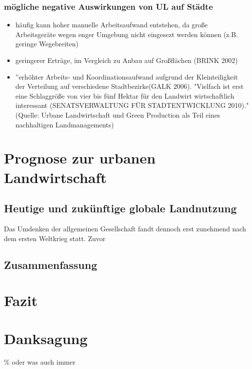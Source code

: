 \documentclass{scrartcl}
\begin{document}
     
 \subsubsection{mögliche negative Auswirkungen von UL auf Städte}
 \begin{itemize}
     \item häufig kann hoher manuelle Arbeitsaufwand entstehen, da große Arbeitsgeräte wegen enger Umgebung nicht eingesezt werden können (z.B. geringe Wegebreiten)
     \item geringerer Erträge, im Vergleich zu Anbau auf Großflächen (BRINK 2002)
     \item ”erhöhter Arbeits‐ und Koordinationsaufwand aufgrund der Kleinteiligkeit der Verteilung auf verschiedene Stadtbezirke(GALK 2006). "Vielfach ist erst eine Schlaggröße von vier bis fünf Hektar für den Landwirt wirtschaftlich interessant (SENATSVERWALTUNG FÜR STADTENTWICKLUNG 2010)." (Quelle: Urbane Landwirtschaft und Green Production als Teil eines nachhaltigen Landmanagements)
 \end{itemize}
\section{Prognose zur urbanen Landwirtschaft}
\subsection{Heutige und zukünftige globale Landnutzung}
Das Umdenken der allgemeinen Gesellschaft fandt dennoch erst zunehmend nach dem ersten Weltkrieg statt. Zuvor 
\subsection{Zusammenfassung}
\section{Fazit}

\section{Danksagung}

\newpage
\listoffigures

\begingroup
\singlespacing
\setlength\bibitemsep{10pt}\% oder was auch immer
\printbibliography
\endgroup
\end{document}
